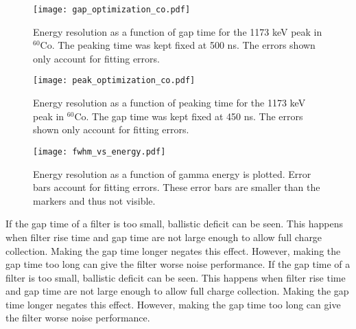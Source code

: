 \begin{figure}[]
\begin{centering}
\texttt{[image: gap\_optimization\_co.pdf]}
\caption{Energy resolution as a function of gap time for the 1173 keV peak in ${}^{60}$Co. The peaking time was kept fixed at 500 ns. The errors shown only account for fitting errors.}
\label{gap}
\end{centering}
\end{figure}
\vspace{5mm}

\begin{figure}[]
\begin{centering}
\texttt{[image: peak\_optimization\_co.pdf]}
\caption{Energy resolution as a function of peaking time for the 1173 keV peak in ${}^{60}$Co. The gap time was kept fixed at 450 ns. The errors shown only account for fitting errors.}
\label{peak}
\end{centering}
\end{figure}
\vspace{5mm}

\begin{figure}[]
\begin{centering}
\texttt{[image: fwhm\_vs\_energy.pdf]}
\caption{Energy resolution as a function of gamma energy is plotted. Error bars account for fitting errors. These error bars are smaller than the markers and thus not visible.}
\label{peak}
\end{centering}
\end{figure}
\vspace{5mm}

If the gap time of a filter is too small, ballistic deficit can be seen. This happens when filter rise time and gap time are not large enough to allow full charge collection. Making the gap time longer negates this effect. However, making the gap time too long can give the filter worse noise performance. 
If the gap time of a filter is too small, ballistic deficit can be seen. This happens when filter rise time and gap time are not large enough to allow full charge collection. Making the gap time longer negates this effect. However, making the gap time too long can give the filter worse noise performance. 